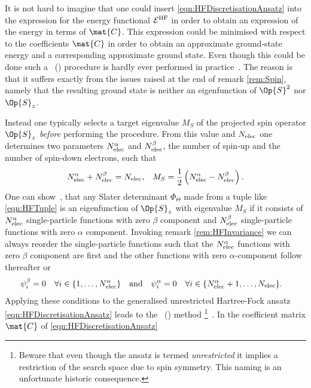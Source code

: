 \begin{rem}
	It is not hard to imagine
	that one could insert \eqref{eqn:HFDiscretisationAnsatz}
	into the expression for the \HF energy functional $\mathcal{E}^\text{HF}$
	in order to obtain an expression of the \HF energy
	in terms of $\mat{C}$.
	This expression could be minimised
	with respect to the coefficients $\mat{C}$
	in order to obtain an approximate
	\HF ground-state energy and a corresponding approximate \HF ground state.
	Even though this could be done
	such a ~(\GUHF)
	procedure is hardly ever performed in practice~\cite{McWeeny1985}.
	The reason is that it suffers
	exactly from the issues raised at the end of remark \vref{rem:Spin},
	namely that the resulting \HF ground state
	is neither an eigenfunction of $\Op{S}^2$ nor $\Op{S}_z$.

	Instead one typically selects a target eigenvalue $M_S$
	of the projected spin operator $\Op{S}_z$ \emph{before}
	performing the \HF procedure.
	From this value and $N_\text{elec}$ one determines two parameters
	$N_\text{elec}^\alpha$ and $N_\text{elec}^\beta$,
	the number of spin-up and the number of spin-down electrons,
	such that
	\begin{align*}
		N_\text{elec}^\alpha + N_\text{elec}^\beta &= N_\text{elec}, & M_S = \frac12 \left( N_\text{elec}^\alpha - N_\text{elec}^\beta\right).
	\end{align*}
	One can show~\cite{Szabo1996,Helgaker2013},
	that any Slater determinant $\Phi_\Theta$
	made from a tuple like \eqref{eqn:HFTuple}
	is an eigenfunction of $\Op{S}_z$ with eigenvalue $M_S$
	if it consists of $N_\text{elec}^\alpha$ single-particle functions with zero $\beta$
	component and $N_\text{elec}^\beta$ single-particle functions with zero $\alpha$ component.
	Invoking remark \vref{rem:HFInvariance}
	we can always reorder the single-particle functions
	such that the $N_\text{elec}^\alpha$ functions with zero $\beta$ component are first
	and the other functions with zero $\alpha$-component follow thereafter
	or
	\begin{align*}
		\psi_i^\beta  &= 0 \quad \forall i \in \{1,\ldots,N_\text{elec}^\alpha\}
		&&\text{and}&
		\psi_i^\alpha  &= 0 \quad \forall i \in \{N_\text{elec}^\alpha+1,\ldots,N_\text{elec}\}.
	\end{align*}
	Applying these conditions
	to the generalised unrestricted Hartree-Fock ansatz \eqref{eqn:HFDiscretisationAnsatz}
	leads to the ~(\UHF) method%
	\footnote{
		Beware that even though the \UHF ansatz is termed \emph{unrestricted}
		it implies a restriction of the search space due to spin symmetry.
		This naming is an unfortunate historic consequence.
	}~\cite{Pople1954}.
	In \UHF the coefficient matrix $\mat{C}$ of \eqref{eqn:HFDiscretisationAnsatz}

\end{rem}
